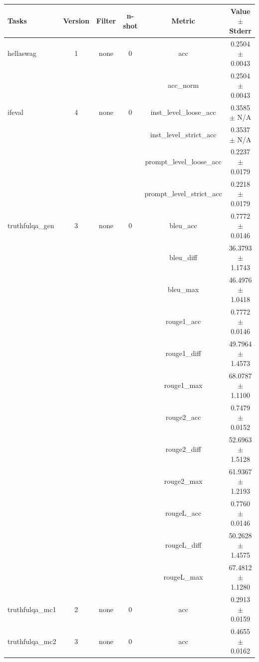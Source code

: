 \documentclass{ifacconf}
\begin{document}
\begin{strip}
\begin{minipage}{\textwidth}
    \begin{table}[H]
    \centering
    \begin{tabular}{|l|c|c|c|c|c|}
    \hline
    \textbf{Tasks} & \textbf{Version} & \textbf{Filter} & \textbf{n-shot} & \textbf{Metric} & \textbf{Value} $\pm$ \textbf{Stderr} \\ \hline
    hellaswag & 1 & none & 0 & acc & 0.2504 $\pm$ 0.0043 \\ \hline
    & & & & acc\_norm & 0.2504 $\pm$ 0.0043 \\ \hline
    ifeval & 4 & none & 0 & inst\_level\_loose\_acc & 0.3585 $\pm$ N/A \\ \hline
    & & & & inst\_level\_strict\_acc & 0.3537 $\pm$ N/A \\ \hline
    & & & & prompt\_level\_loose\_acc & 0.2237 $\pm$ 0.0179 \\ \hline
    & & & & prompt\_level\_strict\_acc & 0.2218 $\pm$ 0.0179 \\ \hline
    truthfulqa\_gen & 3 & none & 0 & bleu\_acc & 0.7772 $\pm$ 0.0146 \\ \hline
    & & & & bleu\_diff & 36.3793 $\pm$ 1.1743 \\ \hline
    & & & & bleu\_max & 46.4976 $\pm$ 1.0418 \\ \hline
    & & & & rouge1\_acc & 0.7772 $\pm$ 0.0146 \\ \hline
    & & & & rouge1\_diff & 49.7964 $\pm$ 1.4573 \\ \hline
    & & & & rouge1\_max & 68.0787 $\pm$ 1.1100 \\ \hline
    & & & & rouge2\_acc & 0.7479 $\pm$ 0.0152 \\ \hline
    & & & & rouge2\_diff & 52.6963 $\pm$ 1.5128 \\ \hline
    & & & & rouge2\_max & 61.9367 $\pm$ 1.2193 \\ \hline
    & & & & rougeL\_acc & 0.7760 $\pm$ 0.0146 \\ \hline
    & & & & rougeL\_diff & 50.2628 $\pm$ 1.4575 \\ \hline
    & & & & rougeL\_max & 67.4812 $\pm$ 1.1280 \\ \hline
    truthfulqa\_mc1 & 2 & none & 0 & acc & 0.2913 $\pm$ 0.0159 \\ \hline
    truthfulqa\_mc2 & 3 & none & 0 & acc & 0.4655 $\pm$ 0.0162 \\ \hline
    \end{tabular}
    \label{tab:gemma2_q5km}
    \end{table}
\end{minipage}
\end{strip}
\end{document}
